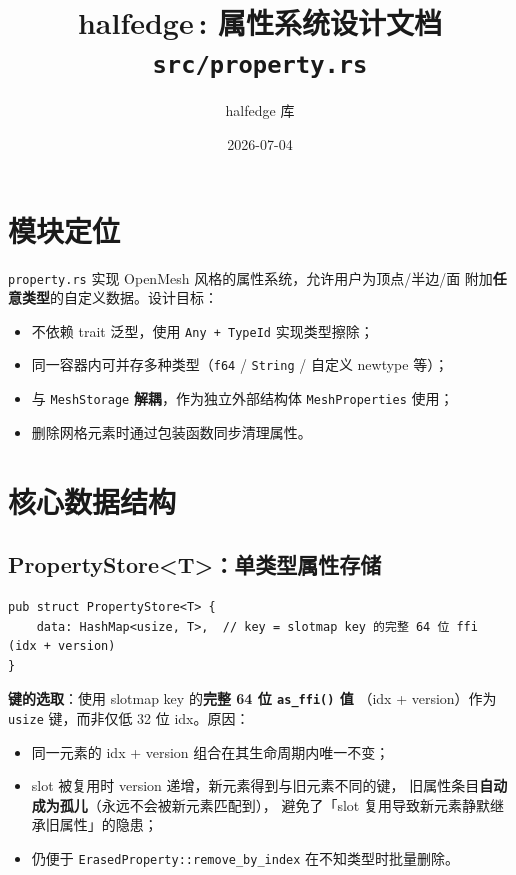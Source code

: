 \documentclass[11pt,a4paper]{article}
\title{\textbf{halfedge\,: 属性系统设计文档} \\ \large \texttt{src/property.rs}}
\author{halfedge 库}
\date{2026-07-04}
\begin{document}
\maketitle
\tableofcontents

\section{模块定位}

\texttt{property.rs} 实现 OpenMesh 风格的属性系统，允许用户为顶点/半边/面
附加\textbf{任意类型}的自定义数据。设计目标：

\begin{itemize}
  \item 不依赖 trait 泛型，使用 \texttt{Any + TypeId} 实现类型擦除；
  \item 同一容器内可并存多种类型（\texttt{f64} / \texttt{String} / 自定义 newtype 等）；
  \item 与 \texttt{MeshStorage} \textbf{解耦}，作为独立外部结构体
        \texttt{MeshProperties} 使用；
  \item 删除网格元素时通过包装函数同步清理属性。
\end{itemize}

\section{核心数据结构}

\subsection{PropertyStore<T>：单类型属性存储}

\begin{lstlisting}
pub struct PropertyStore<T> {
    data: HashMap<usize, T>,  // key = slotmap key 的完整 64 位 ffi (idx + version)
}
\end{lstlisting}

\textbf{键的选取}：使用 slotmap key 的\textbf{完整 64 位 \texttt{as\_ffi()} 值}
（idx + version）作为 \texttt{usize} 键，而非仅低 32 位 idx。原因：

\begin{itemize}
  \item 同一元素的 idx + version 组合在其生命周期内唯一不变；
  \item slot 被复用时 version 递增，新元素得到与旧元素不同的键，
        旧属性条目\textbf{自动成为孤儿}（永远不会被新元素匹配到），
        避免了「slot 复用导致新元素静默继承旧属性」的隐患；
  \item 仍便于 \texttt{ErasedProperty::remove\_by\_index} 在不知类型时批量删除。
\end{itemize}
\end{document}
